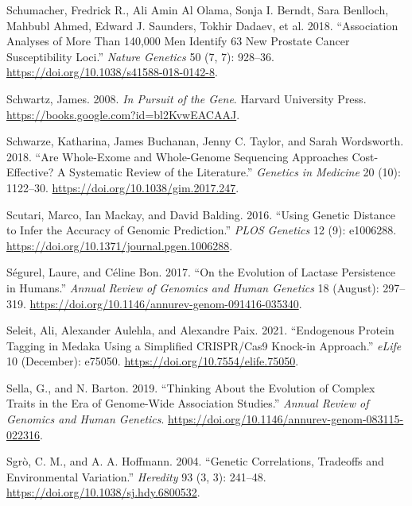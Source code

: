 \documentclass[
]{book}
\newlength{\cslhangindent}
\newlength{\cslentryspacingunit} %
\newenvironment{CSLReferences}[2] %
 {%
  \setlength{\parindent}{0pt}
  \ifodd #1
  \let\oldpar\par
  \def\par{\hangindent=\cslhangindent\oldpar}
  \fi
  \setlength{\parskip}{#2\cslentryspacingunit}
 }%
 {}
\begin{document}
\begin{CSLReferences}{1}{0}
\leavevmode{}%
Schumacher, Fredrick R., Ali Amin Al Olama, Sonja I. Berndt, Sara Benlloch, Mahbubl Ahmed, Edward J. Saunders, Tokhir Dadaev, et al. 2018. {``Association Analyses of More Than 140,000 Men Identify 63 New Prostate Cancer Susceptibility Loci.''} \emph{Nature Genetics} 50 (7, 7): 928--36. \url{https://doi.org/10.1038/s41588-018-0142-8}.

\leavevmode{}%
Schwartz, James. 2008. \emph{In {Pursuit} of the {Gene}}. {Harvard University Press}. \url{https://books.google.com?id=bl2KvwEACAAJ}.

\leavevmode{}%
Schwarze, Katharina, James Buchanan, Jenny C. Taylor, and Sarah Wordsworth. 2018. {``Are Whole-Exome and Whole-Genome Sequencing Approaches Cost-Effective? {A} Systematic Review of the Literature.''} \emph{Genetics in Medicine} 20 (10): 1122--30. \url{https://doi.org/10.1038/gim.2017.247}.

\leavevmode{}%
Scutari, Marco, Ian Mackay, and David Balding. 2016. {``Using {Genetic Distance} to {Infer} the {Accuracy} of {Genomic Prediction}.''} \emph{PLOS Genetics} 12 (9): e1006288. \url{https://doi.org/10.1371/journal.pgen.1006288}.

\leavevmode{}%
Ségurel, Laure, and Céline Bon. 2017. {``On the {Evolution} of {Lactase Persistence} in {Humans}.''} \emph{Annual Review of Genomics and Human Genetics} 18 (August): 297--319. \url{https://doi.org/10.1146/annurev-genom-091416-035340}.

\leavevmode{}%
Seleit, Ali, Alexander Aulehla, and Alexandre Paix. 2021. {``Endogenous Protein Tagging in Medaka Using a Simplified {CRISPR}/{Cas9} Knock-in Approach.''} \emph{eLife} 10 (December): e75050. \url{https://doi.org/10.7554/elife.75050}.

\leavevmode{}%
Sella, G., and N. Barton. 2019. {``Thinking {About} the {Evolution} of {Complex Traits} in the {Era} of {Genome-Wide Association Studies}.''} \emph{Annual Review of Genomics and Human Genetics}. \url{https://doi.org/10.1146/annurev-genom-083115-022316}.

\leavevmode{}%
Sgrò, C. M., and A. A. Hoffmann. 2004. {``Genetic Correlations, Tradeoffs and Environmental Variation.''} \emph{Heredity} 93 (3, 3): 241--48. \url{https://doi.org/10.1038/sj.hdy.6800532}.


\end{CSLReferences}
\end{document}
